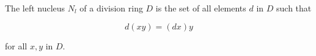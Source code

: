 The left nucleus $N_l$ of a division ring $D$ is the set of all elements $d$ in $D$ such that

$$d(xy) = (dx)y$$

for all $x, y$ in $D$.

